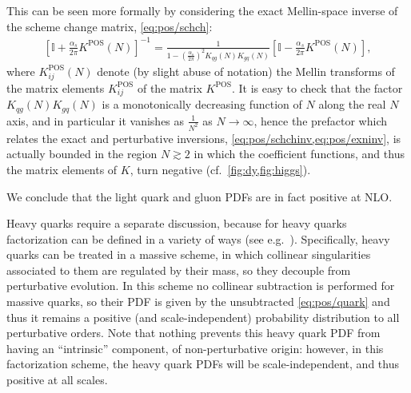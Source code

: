 This can be seen more formally by considering the exact Mellin-space
inverse of the scheme change matrix, \cref{eq:pos/schch}:
\begin{align}\label{eq:pos/exninv}
\left[\mathbb{I}
  +\frac{\alpha_s}{2\pi}  K^{\textrm{POS}}(N) \right] ^{-1}=
\frac{1}{1-\left(\frac{\alpha_s}{2\pi}\right)^2 K_{qg}(N)K_{gq}(N) } \left[\mathbb{I}
  -\frac{\alpha_s}{2\pi}  K^{\textrm{POS}}(N)\right],
\end{align}
where $K^{\textrm{POS}}_{ij}(N)$ denote (by slight abuse of notation) the Mellin
transforms of the matrix elements $K^{\textrm{POS}}_{ij}$ of the matrix
$K^{\textrm{POS}}$.
It is easy to check that the factor $ K_{qg}(N)K_{gq}(N)$ is a
monotonically decreasing function of $N$ along the real $N$ axis, and
in particular it vanishes as $\frac{1}{N^2}$ as $N\to\infty$, hence
the prefactor which relates the exact and perturbative inversions,
\cref{eq:pos/schchinv,eq:pos/exninv}, is actually bounded in the
region $N\gtrsim 2$ in which the \msbar{} coefficient functions, and
thus the matrix elements of $K$, turn negative (cf.\ \cref{fig:dy,fig:higgs}). 

We conclude that the light quark and gluon \msbar{} PDFs are in fact positive
at NLO.

Heavy quarks require a separate discussion, because for heavy quarks \msbar{}
factorization can be defined in a variety of ways (see
e.g.~\cite{Forte:2010ta}).
Specifically, heavy quarks can be treated in a
massive scheme, in which   collinear singularities
associated to them are regulated by their mass, so they decouple from
perturbative evolution. In this scheme no collinear subtraction is
performed for massive quarks, so their PDF is given by the
unsubtracted 
\cref{eq:pos/quark}  and thus it remains a  positive (and
scale-independent) probability distribution to all perturbative
orders. Note that nothing prevents this heavy quark PDF from having an
``intrinsic''  component, of non-perturbative origin: however, in this
factorization scheme, the heavy quark PDFs will be scale-independent,
and thus positive at all scales.

